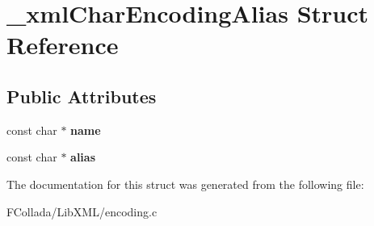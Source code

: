 \hypertarget{struct__xmlCharEncodingAlias}{
\section{\_\-xmlCharEncodingAlias Struct Reference}
\label{struct__xmlCharEncodingAlias}
}
\subsection*{Public Attributes}
\begin{DoxyCompactItemize}
\item 
\hypertarget{struct__xmlCharEncodingAlias_a064415fa566c4ea71818e0e1c83e4eb3}{
const char $\ast$ {\bfseries name}}
\label{struct__xmlCharEncodingAlias_a064415fa566c4ea71818e0e1c83e4eb3}

\item 
\hypertarget{struct__xmlCharEncodingAlias_a2a5cacbbe741e8b32c9b04a9644e6d61}{
const char $\ast$ {\bfseries alias}}
\label{struct__xmlCharEncodingAlias_a2a5cacbbe741e8b32c9b04a9644e6d61}

\end{DoxyCompactItemize}


The documentation for this struct was generated from the following file:\begin{DoxyCompactItemize}
\item 
FCollada/LibXML/encoding.c\end{DoxyCompactItemize}
